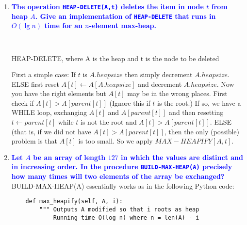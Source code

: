 \documentclass[11pt]{article}
\begin{document}
\begin{enumerate}
\item \textbf{\textcolor{blue}{The operation {\tt HEAP-DELETE(A,t)} deletes the item in node $t$
from heap $A$.  Give an implementation of {\tt HEAP-DELETE} that runs in
$O(\lg n)$ time for an $n$-element max-heap.}}
    \\
    \begin{algorithm}[H]
        \Indm{}\\
        \Indp
        \caption{HEAP-DELETE, where A is the heap and t is the node to be deleted}
    \end{algorithm}
    First a simple case: If $t$ is $A.heapsize$ then simply decrement
    $A.heapsize$.  ELSE first reset $A[t]\leftarrow A[A.heapsize]$ and
    decrement $A.heapsize$.  Now you have the right elements but $A[t]$
    may be in the wrong places.  First check if $A[t]> A[parent[t]]$
    (Ignore this if $t$ is the root.)  If so, we have a WHILE loop,
    exchanging $A[t]$ and $A[parent[t]]$ and then resetting $t\leftarrow parent[t]$
    while $t$ is not the root and $A[t]> A[parent[t]]$. ELSE (that is, if
    we did not have $A[t]> A[parent[t]]$, then the only (possible) problem
    is that $A[t]$ is too small.  So we apply $MAX-HEAPIFY[A,t]$.

\item \textbf{\textcolor{blue}{Let $A$ be an array of length $127$ in which the values are distinct and in increasing order. In the procedure {\tt BUILD-MAX-HEAP(A)} precisely how many times will two elements of the array be exchanged?}}
    \\ BUILD-MAX-HEAP(A) essentially works as in the following Python code:
    \begin{verbatim}
    def max_heapify(self, A, i):
        """ Outputs A modified so that i roots as heap
            Running time O(log n) where n = len(A) - i
            

\end{verbatim}
\end{enumerate}
\end{document}

